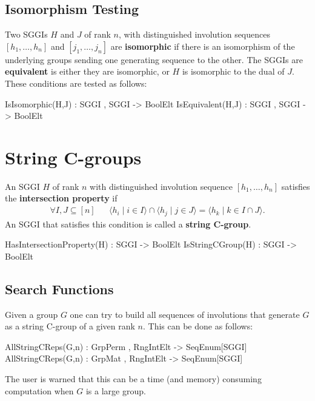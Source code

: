 \documentclass{documentation}
\begin{document}
\section{Isomorphism Testing}
\label{sec:construct}
Two SGGIs $H$ and $J$ of rank $n$, with distinguished involution sequences $[h_1,\ldots,h_n]$ and $[j_1,\ldots,j_n]$
are {\bf isomorphic} if there is an isomorphism of the underlying groups sending one generating sequence to the other.
The SGGIs are {\bf equivalent} is either they are isomorphic, or $H$ is isomorphic to the dual of $J$. These conditions
are tested as follows:
\begin{intrinsics}
IsIsomorphic(H,J) : SGGI , SGGI -> BoolElt
IsEquivalent(H,J) : SGGI , SGGI -> BoolElt
\end{intrinsics}


\chapter{String C-groups}
\label{sec:string-C-gp}
An SGGI $H$ of rank $n$ with distinguished involution sequence $[h_1,\ldots,h_n]$
satisfies the {\bf intersection property} if
\begin{align}
\forall I,J\subseteq [n] && \langle h_i\mid i\in I \rangle \cap \langle h_j\mid j\in J\rangle = \langle h_k\mid k\in I\cap J\rangle.
\end{align}
An SGGI that satisfies this condition is called a {\bf string C-group}.
\begin{intrinsics}
HasIntersectionProperty(H) : SGGI -> BoolElt
IsStringCGroup(H) : SGGI  -> BoolElt
\end{intrinsics}

\section{Search Functions}
\label{sec:search}
Given a group $G$ one can try to build all sequences of involutions that generate $G$ as a string C-group 
of a given rank $n$. This can be done as follows:
\begin{intrinsics}
AllStringCReps(G,n) : GrpPerm , RngIntElt -> SeqEnum[SGGI]
AllStringCReps(G,n) : GrpMat , RngIntElt -> SeqEnum[SGGI]
\end{intrinsics}
The user is warned that this can be a time (and memory) consuming computation when $G$ is a large group.


\end{document}
